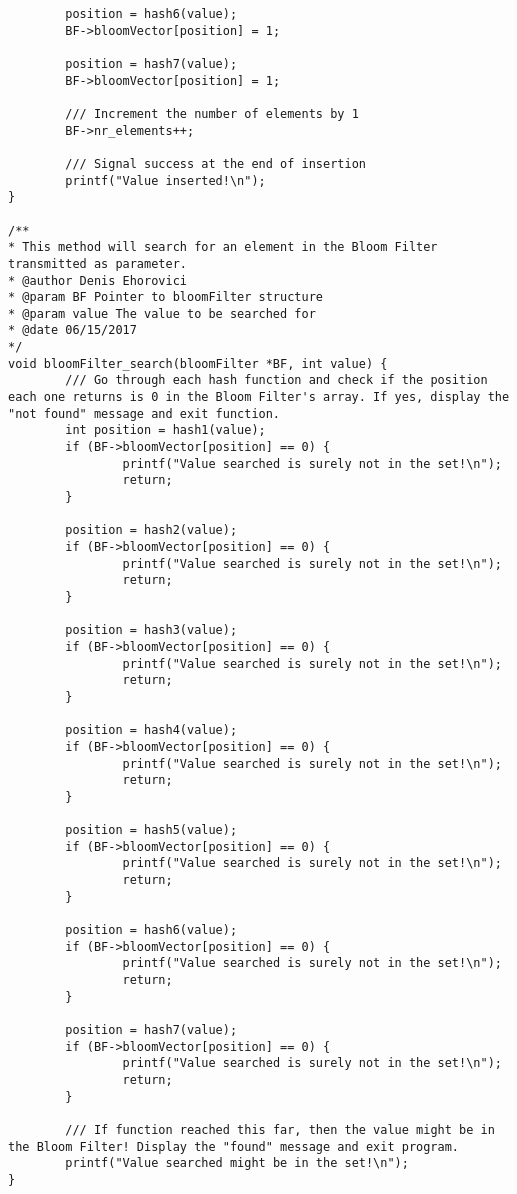 \documentclass[14pt]{article}
\begin{document}
\begin{lstlisting}
        position = hash6(value);
        BF->bloomVector[position] = 1;

        position = hash7(value);
        BF->bloomVector[position] = 1;

        /// Increment the number of elements by 1
        BF->nr_elements++;

        /// Signal success at the end of insertion
        printf("Value inserted!\n");
}

/**
* This method will search for an element in the Bloom Filter transmitted as parameter.
* @author Denis Ehorovici
* @param BF Pointer to bloomFilter structure
* @param value The value to be searched for
* @date 06/15/2017
*/
void bloomFilter_search(bloomFilter *BF, int value) {
        /// Go through each hash function and check if the position each one returns is 0 in the Bloom Filter's array. If yes, display the "not found" message and exit function.
        int position = hash1(value);
        if (BF->bloomVector[position] == 0) {
                printf("Value searched is surely not in the set!\n");
                return;
        }

        position = hash2(value);
        if (BF->bloomVector[position] == 0) {
                printf("Value searched is surely not in the set!\n");
                return;
        }

        position = hash3(value);
        if (BF->bloomVector[position] == 0) {
                printf("Value searched is surely not in the set!\n");
                return;
        }

        position = hash4(value);
        if (BF->bloomVector[position] == 0) {
                printf("Value searched is surely not in the set!\n");
                return;
        }

        position = hash5(value);
        if (BF->bloomVector[position] == 0) {
                printf("Value searched is surely not in the set!\n");
                return;
        }

        position = hash6(value);
        if (BF->bloomVector[position] == 0) {
                printf("Value searched is surely not in the set!\n");
                return;
        }

        position = hash7(value);
        if (BF->bloomVector[position] == 0) {
                printf("Value searched is surely not in the set!\n");
                return;
        }

        /// If function reached this far, then the value might be in the Bloom Filter! Display the "found" message and exit program.
        printf("Value searched might be in the set!\n");
}

\end{lstlisting}
\end{document}
